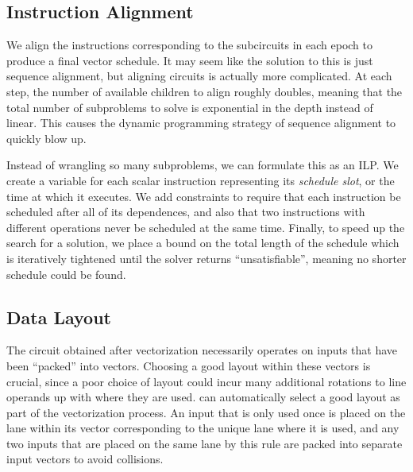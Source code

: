 \subsection{Instruction Alignment}\label{sec:instruction-alignment}
We align the instructions corresponding to the subcircuits in each epoch to produce a final vector schedule.
It may seem like the solution to this is just sequence alignment, but aligning circuits is actually more complicated.
At each step, the number of available children to align roughly doubles, meaning that the total number of subproblems to solve is exponential in the depth instead of linear. 
This causes the dynamic programming strategy of sequence alignment to quickly blow up.

Instead of wrangling so many subproblems, we can formulate this as an ILP.
We create a variable for each scalar instruction representing its {\em schedule slot}, or the time at which it executes.
We add constraints to require that each instruction be scheduled after all of its dependences, and also that two instructions with different operations never be scheduled at the same time. 
Finally, to speed up the search for a solution, we place a bound on the total length of the schedule which is iteratively tightened until the solver returns ``unsatisfiable'', meaning no shorter schedule could be found. %

\subsection{Data Layout}\label{sec:data-layout}
The circuit obtained after vectorization necessarily operates on inputs that have been ``packed'' into vectors.
Choosing a good layout within these vectors is crucial, since a poor choice of layout could incur many additional rotations to line operands up with where they are used.
{\system} can automatically select a good layout as part of the vectorization process.
An input that is only used once is placed on the lane within its vector corresponding to the unique lane where it is used, and any two inputs that are placed on the same lane by this rule are packed into separate input vectors to avoid collisions.

